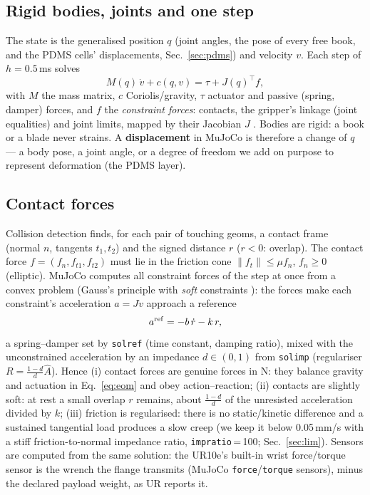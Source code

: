 \documentclass[10pt,twocolumn]{article}
\newcommand{\code}[1]{\texttt{\small #1}}
\begin{document}
\subsection{Rigid bodies, joints and one step}
The state is the generalised position $q$ (joint angles, the pose of every free book, and the PDMS cells'
displacements, Sec.~\ref{sec:pdms}) and velocity $v$. Each step of $h=0.5$\,ms solves
\begin{equation}
M(q)\,\dot v + c(q,v) = \tau + J(q)^{\top} f ,
\label{eq:eom}
\end{equation}
with $M$ the mass matrix, $c$ Coriolis/gravity, $\tau$ actuator and passive (spring, damper) forces, and $f$ the
\emph{constraint forces}: contacts, the gripper's linkage (joint equalities) and joint limits, mapped by their
Jacobian $J$ \cite{todorov2012mujoco}. Bodies are rigid: a book or a blade never strains. A
\textbf{displacement} in MuJoCo is therefore a change of $q$ --- a body pose, a joint angle, or a degree of freedom
we add on purpose to represent deformation (the PDMS layer).

\subsection{Contact forces}
Collision detection finds, for each pair of touching geoms, a contact frame (normal $n$, tangents $t_1,t_2$) and
the signed distance $r$ ($r<0$: overlap). The contact force $f=(f_n,f_{t1},f_{t2})$ must lie in the friction cone
$\|f_t\|\le\mu f_n$, $f_n\ge 0$ (elliptic). MuJoCo computes all constraint forces of the step at once from a
convex problem (Gauss's principle with \emph{soft} constraints \cite{todorov2014convex,mujocodocs}): the forces make
each constraint's acceleration $a=J\dot v$ approach a reference
\begin{equation}
a^{\rm ref} = -b\,\dot r - k\,r ,
\label{eq:aref}
\end{equation}
a spring--damper set by \code{solref} (time constant, damping ratio), mixed with the unconstrained acceleration by
an impedance $d\in(0,1)$ from \code{solimp} (regulariser $R=\tfrac{1-d}{d}\hat A$). Hence (i) contact forces are
genuine forces in N: they balance gravity and actuation in Eq.~\eqref{eq:eom} and obey action--reaction;
(ii) contacts are slightly soft: at rest a small overlap $r$ remains, about $\tfrac{1-d}{d}$ of the unresisted
acceleration divided by $k$; (iii) friction is regularised: there is no static/kinetic difference and a sustained
tangential load produces a slow creep (we keep it below 0.05\,mm/s with a stiff friction-to-normal impedance ratio,
\code{impratio}\,=\,100; Sec.~\ref{sec:lim}).
Sensors are computed from the same solution: the UR10e's built-in wrist force/torque sensor is the wrench the
flange transmits (MuJoCo \code{force}/\code{torque} sensors), minus the declared payload weight, as UR reports it.
\end{document}
